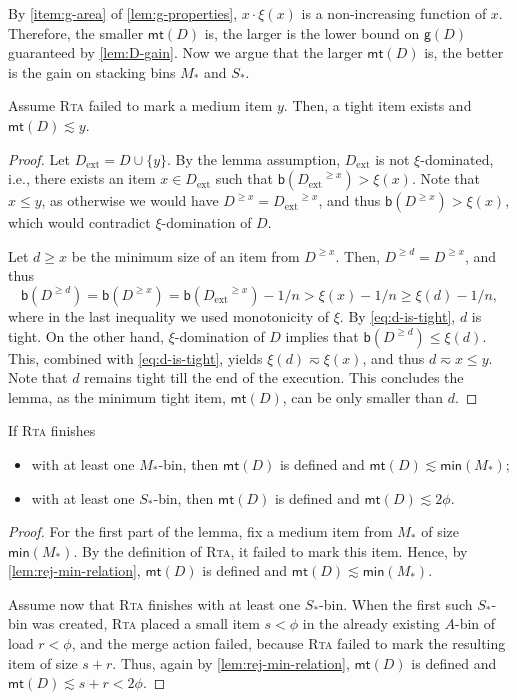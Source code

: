 \documentclass[a4paper,USenglish,cleveref]{lipics-v2019}
\newcommand{\A}{\ensuremath{A}\xspace}
\newcommand{\ST}{\ensuremath{S_*}\xspace}
\newcommand{\MT}{\ensuremath{M_*}\xspace}
\newcommand{\D}{\ensuremath{D}\xspace}
\newcommand{\Dext}{\ensuremath{D_\mathrm{ext}}\xspace}
\newcommand{\smallBoundary}{\ensuremath{\phi}}
\newcommand{\g}{\ensuremath{\xi}}
\newcommand{\B}{\textsf{b}}
\newcommand{\gain}{\textsf{g}}
\newcommand{\mn}{\textsf{min}}
\newcommand{\mt}{\textsf{mt}(\D)}
\newcommand{\ALG}{\textsc{Rta}\xspace}
\begin{document}
By \cref{item:g-area} of \cref{lem:g-properties}, $x \cdot \g(x)$ is a non-increasing 
function of $x$. Therefore, the smaller $\mt$ is, the larger is the lower bound
on $\gain(\D)$ guaranteed by \cref{lem:D-gain}. Now we argue that the larger $\mt$ is,
the better is the gain on stacking bins $\MT$ and $\ST$.

\begin{lemma}
\label{lem:rej-min-relation}
Assume \ALG failed to mark a medium item $y$.
Then, a tight item exists and $\mt \lesssim y$.
\end{lemma}

\begin{proof}
Let $\Dext = \D \cup \{y\}$. By the lemma assumption, \Dext is not
$\g$-dominated, i.e., there exists an item $x \in \Dext$ such that
$\B(\Dext^{\geq x}) > \g(x)$. Note that $x \leq y$, as otherwise we would
have $\D^{\geq x} = \Dext^{\geq x}$, and thus $\B(\D^{\geq x}) >
\g(x)$, which would contradict $\g$-domination of $D$.

Let $d \geq x$ be the minimum size of an item from $\D^{\geq x}$. 
Then, $\D^{\geq d} = \D^{\geq x}$, and thus 
\begin{equation}
\label{eq:d-is-tight} 
  \B(\D^{\geq d}) = \B(\D^{\geq x})
  = \B(\Dext^{\geq x}) - 1/n > \g(x) - 1/n \geq \g(d) - 1/n, 
\end{equation}
where in the last inequality we used monotonicity of $\g$. By
\eqref{eq:d-is-tight}, $d$ is tight. On the other hand, $\g$-domination of $\D$
implies that $\B(\D^{\geq d}) \leq \g(d)$. This, combined with
\eqref{eq:d-is-tight}, yields $\g(d) \eqsim \g(x)$, and thus $d \eqsim x \leq
y$. Note that $d$ remains tight till the end of the execution. This concludes
the lemma, as the minimum tight item, $\mt$, can be only smaller than $d$. 
\end{proof}


\begin{lemma}
\label{lem:mtD-min-stacked}
If \ALG finishes 
\begin{itemize}
\item with at least one \MT-bin, then $\mt$ is defined and
$\mt \lesssim \mn(\MT)$;
\item with at least one
\ST-bin, then $\mt$ is defined and $\mt \lesssim 2 \smallBoundary$.
\end{itemize}
\end{lemma}

\begin{proof}
For the first part of the lemma, fix a medium item from \MT of size
$\mn(\MT)$. By the definition of \ALG, it failed to mark this item.
Hence, by \cref{lem:rej-min-relation}, $\mt$ is defined and $\mt \lesssim
\mn(\MT)$.

Assume now that \ALG finishes with at least one \ST-bin. When the first such
\ST-bin was created, \ALG placed a small item $s < \smallBoundary$ in the
already existing \A-bin of load $r < \smallBoundary$, and the merge action
failed, because \ALG failed to mark the resulting item of size $s+r$. Thus,
again by \cref{lem:rej-min-relation}, $\mt$ is defined and $\mt \lesssim s+r
< 2\smallBoundary$.
\end{proof}
\end{document}
